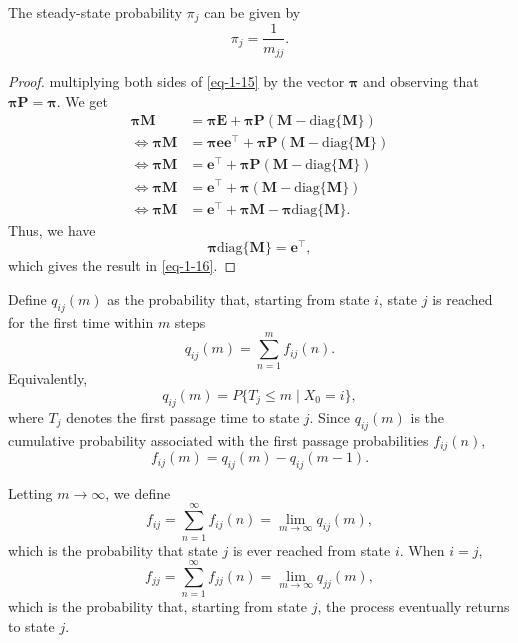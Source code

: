 \documentclass[../Note.tex]{subfiles}
\begin{document}
\begin{proposition}
    The steady-state probability $\pi_{j}$ can be given by
    \begin{equation}
        \label{eq-1-16}
        \pi_{j} = \frac{1}{m_{jj}}.
    \end{equation} 
\end{proposition}
\begin{proof}
    multiplying both sides of \eqref{eq-1-15} by the vector $\bm{\pi}$ and observing that $\bm{\pi} \mathbf{P} = \bm{\pi}$. We get 
    \[
    \begin{aligned}
        \bm{\pi} \mathbf{M} & = \bm{\pi} \mathbf{E} + \bm{\pi} \mathbf{P}(\mathbf{M} - \mathrm{diag}\{\mathbf{M}\}) \\
        \Leftrightarrow  
        \bm{\pi} \mathbf{M} & = \bm{\pi}\bm{e}\bm{e}^{\top} + \bm{\pi} \mathbf{P}(\mathbf{M} - \mathrm{diag}\{\mathbf{M}\}) \\
        \Leftrightarrow 
        \bm{\pi} \mathbf{M} & = \bm{e}^{\top} + \bm{\pi} \mathbf{P}(\mathbf{M} - \mathrm{diag}\{\mathbf{M}\}) \\
        \Leftrightarrow
        \bm{\pi} \mathbf{M} & = \bm{e}^{\top} + \bm{\pi} (\mathbf{M} - \mathrm{diag}\{\mathbf{M}\}) \\
        \Leftrightarrow
        \bm{\pi} \mathbf{M} & = \bm{e}^{\top} + \bm{\pi} \mathbf{M} - \bm{\pi} \mathrm{diag}\{\mathbf{M}\}.
    \end{aligned}
    \] 
    Thus, we have 
    \[
        \bm{\pi} \mathrm{diag}\{\mathbf{M}\} = \bm{e}^{\top},
    \]
    which gives the result in \eqref{eq-1-16}.
\end{proof}

Define $q_{ij}(m)$ as the probability that, starting from state $i$, state $j$ is reached for the first time within $m$ steps
\begin{equation}
    q_{ij}(m) = \sum_{n=1}^{m} f_{ij}(n).
\end{equation} 
Equivalently,
\[
    q_{ij}(m) = P\{T_j \leq m \mid X_0=i\},
\]
where $T_j$ denotes the first passage time to state $j$. Since $q_{ij}(m)$ is the cumulative probability associated with the first passage probabilities $f_{ij}(n)$,
\begin{equation}
    f_{ij}(m) = q_{ij}(m)-q_{ij}(m-1).
\end{equation} 

Letting $m\to\infty$, we define
\begin{equation}
    f_{ij}=\sum_{n=1}^{\infty} f_{ij}(n)=\lim_{m\to\infty} q_{ij}(m),
\end{equation} 
which is the probability that state $j$ is ever reached from state $i$. When $i=j$,
\begin{equation}
    f_{jj}=\sum_{n=1}^{\infty} f_{jj}(n)=\lim_{m\to\infty}q_{jj}(m),
\end{equation} 
which is the probability that, starting from state $j$, the process eventually returns to state $j$.
\end{document}
